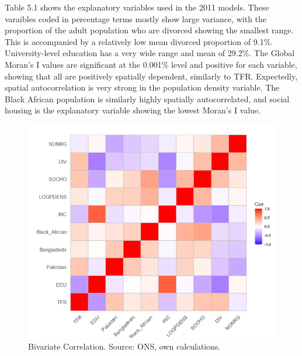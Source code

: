 \documentclass[12pt,twoside]{reedthesis}
\begin{document}
Table 5.1 shows the explanatory variables used in the 2011 models. These varaibles coded in percentage terms mostly show large variance, with the proportion of the adult population who are divorced showing the smallest range. This is accompanied by a relatively low mean divorced proportion of 9.1\%. University-level education has a very wide range and mean of 29.2\%. The Global Moran's I values are significant at the 0.001\% level and positive for each variable, showing that all are positively spatially dependent, similarly to TFR. Expectedly, spatial autocorrelation is very strong in the population density variable. The Black African population is similarly highly spatially autocorrelated, and social housing is the explanatory variable showing the lowest Moran's I value.
\begin{figure}
\includegraphics[width=0.95\linewidth]{figure/Figure_6} \caption{Bivariate Correlation. Source: ONS, own calculations.}\label{fig:figure6}
\end{figure}
\end{document}

